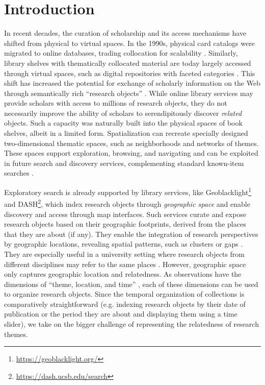 \documentclass[a4paper,UKenglish]{lipics-v2018}
\begin{document}
\section{Introduction}
In recent decades, the curation of scholarship and its access mechanisms have shifted from physical to virtual spaces. In the 1990s, physical card catalogs were migrated to online databases, trading collocation for scalability \cite{baker_1994}. Similarly, library shelves with thematically collocated material are today largely accessed through virtual spaces, such as digital repositories with faceted categories \cite{Hearst2011b}. This shift has increased the potential for exchange of scholarly information on the Web through semantically rich “research objects” \cite{Bechhofer2010d}. While online library services may provide scholars with access to millions of research objects, they do not necessarily improve the ability of scholars to serendipitously discover \textit{related} objects. Such a capacity was naturally built into the physical spaces of book shelves, albeit in a limited
form. 
Spatialization can recreate specially designed two-dimensional thematic spaces, such as neighborhoods and networks of themes. These spaces support exploration, browsing, and navigating and can be exploited in future search and discovery services, complementing standard known-item searches \cite{Fabrikant2000b}. 

Exploratory search is already supported by library services, like Geoblacklight\footnote{\url{https://geoblacklight.org/}} and DASH\footnote{\url{https://dash.ucsb.edu/search}}, which index research objects through \textit{geographic space} and enable  discovery and access through map interfaces. Such services curate and expose research objects based on their geographic footprints, derived from the places that they are about (if any). They enable the integration of research perspectives by geographic locations, revealing spatial patterns, such as clusters or gaps \cite{MacEachren2004c}. They are especially useful in a university setting where research objects from different disciplines may refer to the same places \cite{Lafia2016h}. However, geographic space only captures geographic location and relatedness. As observations have the dimensions of “theme, location, and time” \cite{Sinton1977}, each of these dimensions can be used to organize research objects. Since the temporal organization of collections is comparatively straightforward (e.g. indexing research objects by their date of publication or the period they are about and displaying them using a time slider), we take on the bigger challenge of representing the relatedness of research themes. 
\end{document}
